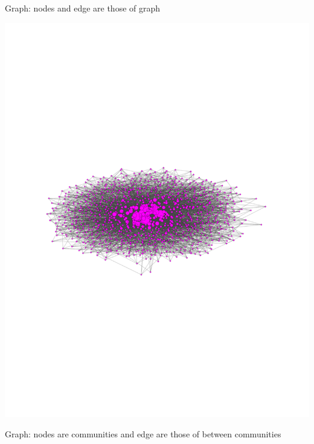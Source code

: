 \documentclass[landscape,paperwidth=70in,paperheight=46in,fontscale=0.225]{baposter} %
\begin{document}
\begin{poster}
{\begin{minipage}{0.48\linewidth}
Graph:  nodes and edge are those of graph

\includegraphics[scale=0.3]{figures/graph_nodes.pdf} 
\end{minipage}
\hfill
\begin{minipage}{0.48\linewidth}

Graph:  nodes are communities
and edge are those of between communities


\end{minipage}}
\end{poster}
\end{document}
